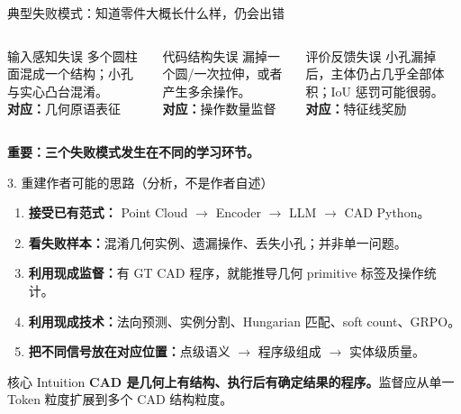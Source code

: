 \documentclass[aspectratio=169,11pt]{beamer}
\begin{document}
\begin{frame}{典型失败模式：知道零件大概长什么样，仍会出错}
\begin{columns}[T]
\begin{block}{输入感知失误}
多个圆柱面混成一个结构；小孔与实心凸台混淆。\\[0.5em]
\textbf{对应：}几何原语表征
\end{block}
\begin{block}{代码结构失误}
漏掉一个圆/一次拉伸，或者产生多余操作。\\[0.5em]
\textbf{对应：}操作数量监督
\end{block}
\begin{block}{评价反馈失误}
小孔漏掉后，主体仍占几乎全部体积；IoU 惩罚可能很弱。\\[0.5em]
\textbf{对应：}特征线奖励
\end{block}
\end{columns}
\vspace{1em}
\centering\large\bfseries 重要：三个失败模式发生在不同的学习环节。
\end{frame}

\begin{frame}{3. 重建作者可能的思路（分析，不是作者自述）}
\small
\begin{enumerate}\setlength{\itemsep}{0.52em}
\item \textbf{接受已有范式：} Point Cloud $\rightarrow$ Encoder $\rightarrow$ LLM $\rightarrow$ CAD Python。
\item \textbf{看失败样本：}混淆几何实例、遗漏操作、丢失小孔；并非单一问题。
\item \textbf{利用现成监督：}有 GT CAD 程序，就能推导几何 primitive 标签及操作统计。
\item \textbf{利用现成技术：}法向预测、实例分割、Hungarian 匹配、soft count、GRPO。
\item \textbf{把不同信号放在对应位置：}点级语义 $\rightarrow$ 程序级组成 $\rightarrow$ 实体级质量。
\end{enumerate}
\begin{block}{核心 Intuition}
\textbf{CAD 是几何上有结构、执行后有确定结果的程序。}监督应从单一 Token 粒度扩展到多个 CAD 结构粒度。
\end{block}
\end{frame}
\end{document}
